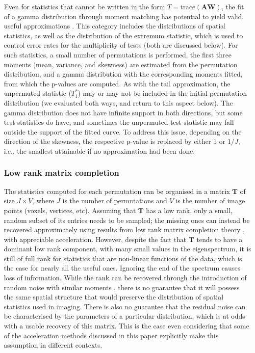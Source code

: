 Even for statistics that cannot be written in the form $T=\text{trace}(\mathbf{A}\mathbf{W})$, the fit of a gamma distribution through moment matching has potential to yield valid, useful approximations \citep{Solomon1978, Minas2014}. This category includes the distributions of spatial statistics, as well as the distribution of the extremum statistic, which is used to control error rates for the multiplicity of tests (both are discussed below). For such statistics, a small number of permutations is performed, the first three moments (mean, variance, and skewness) are estimated from the permutation distribution, and a gamma distribution with the corresponding moments fitted, from which the p-values are computed. As with the tail approximation, the unpermuted statistic ($T^*_1$) may or may not be included in the initial permutation distribution (we evaluated both ways, and return to this aspect below). The gamma distribution does not have infinite support in both directions, but some test statistics do have, and sometimes the unpermuted test statistic may fall outside the support of the fitted curve. To address this issue, depending on the direction of the skewness, the respective p-value is replaced by either 1 or $1/J$, i.e., the smallest attainable if no approximation had been done.

\subsubsection{Low rank matrix completion}

The statistics computed for each permutation can be organised in a matrix $\mathbf{T}$ of size $J \times V$, where $J$ is the number of permutations and $V$ is the number of image points (voxels, vertices, etc). Assuming that $\mathbf{T}$ has a low rank, only a small, random subset of its entries needs to be sampled; the missing ones can instead be recovered approximately using results from low rank matrix completion theory \citep{Candes2009, Candes2010}, with appreciable acceleration. However, despite the fact that $\mathbf{T}$ tends to have a dominant low rank component, with many small values in the eigenspectrum, it is still of full rank for statistics that are non-linear functions of the data, which is the case for nearly all the useful ones. Ignoring the end of the spectrum causes loss of information. While the rank can be recovered through the introduction of random noise with similar moments \citep{Hinrichs2013}, there is no guarantee that it will possess the same spatial structure that would preserve the distribution of spatial statistics used in imaging. There is also no guarantee that the residual noise can be characterised by the parameters of a particular distribution, which is at odds with a usable recovery of this matrix. This is the case even considering that some of the acceleration methods discussed in this paper explicitly make this assumption in different contexts.

